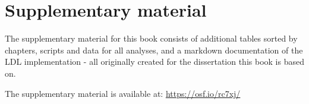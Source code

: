 \chapter{Supplementary material}\label{Supplementary Material}

The supplementary material for this book consists of additional tables sorted by chapters, scripts and data for all analyses, and a markdown documentation of the LDL implementation - all originally created for the dissertation this book is based on. 

The supplementary material is available at: \url{https://osf.io/rc7xj/}
